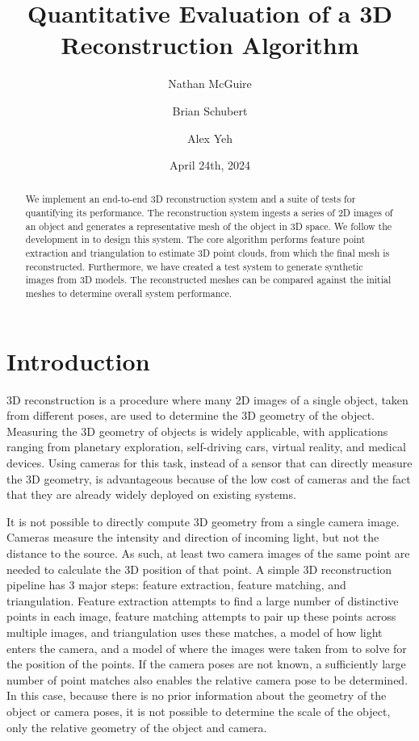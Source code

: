 \documentclass[12pt,letterpaper]{article} %
\title{\bfseries{} Quantitative Evaluation of a 3D Reconstruction Algorithm}
\author{
    Nathan McGuire \\ \FancyEmail{mcguire.n@northeastern.edu} \and
    Brian Schubert \\ \FancyEmail{schubert.b@northeastern.edu}\and
    Alex Yeh \\ \FancyEmail{yeh.al@northeastern.edu}
}
\date{April 24th, 2024}
\begin{document}
\maketitle
\vfill
\begin{abstract}
    We implement an end-to-end 3D reconstruction system and a suite of tests for quantifying its performance. The reconstruction system ingests a series of 2D images of an object and generates a representative mesh of the object in 3D space. We follow the development in \cite{9229407} to design this system. The core algorithm performs feature point extraction and triangulation to estimate 3D point clouds, from which the final mesh is reconstructed.  Furthermore, we have created a test system to generate synthetic images from 3D models.  The reconstructed meshes can be compared against the initial meshes to determine overall system performance.
\end{abstract}
\clearpage
\tableofcontents
\clearpage



\section{Introduction}
3D reconstruction is a procedure where many 2D images of a single object, taken from different poses, are used to determine the 3D geometry of the object.  Measuring the 3D geometry of objects is widely applicable, with applications ranging from planetary exploration, self-driving cars, virtual reality, and medical devices.  Using cameras for this task, instead of a sensor that can directly measure the 3D geometry, is advantageous because of the low cost of cameras and the fact that they are already widely deployed on existing systems.

It is not possible to directly compute 3D geometry from a single camera image.  Cameras measure the intensity and direction of incoming light, but not the distance to the source.  As such, at least two camera images of the same point are needed to calculate the 3D position of that point.  A simple 3D reconstruction pipeline has 3 major steps: feature extraction, feature matching, and triangulation.  Feature extraction attempts to find a large number of distinctive points in each image, feature matching attempts to pair up these points across multiple images, and triangulation uses these matches, a model of how light enters the camera, and a model of where the images were taken from to solve for the position of the points.  If the camera poses are not known, a sufficiently large number of point matches also enables the relative camera pose to be determined.  In this case, because there is no prior information about the geometry of the object or camera poses, it is not possible to determine the scale of the object, only the relative geometry of the object and camera.
\end{document}
